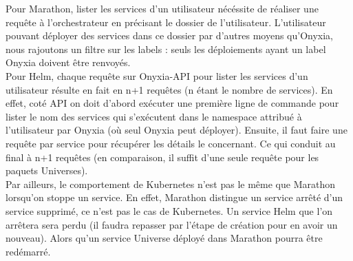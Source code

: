 \documentclass[11pt,fleqn]{book} %
\begin{document}
Pour Marathon, lister les services d'un utilisateur nécéssite de réaliser une requête à l'orchestrateur en précisant le dossier de l'utilisateur. L'utilisateur pouvant déployer des services dans ce dossier par d'autres moyens qu'Onyxia, nous rajoutons un filtre sur les labels : seuls les déploiements ayant un label Onyxia doivent être renvoyés.\\

Pour Helm, chaque requête sur Onyxia-API pour lister les services d'un utilisateur résulte en fait en n+1 requêtes (n étant le nombre de services). En effet, coté API on doit d'abord exécuter une première ligne de commande pour lister le nom des services qui s'exécutent dans le namespace attribué à l'utilisateur par Onyxia (où seul Onyxia peut déployer). Ensuite, il faut faire une requête par service pour récupérer les détails le concernant. Ce qui conduit au final à n+1 requêtes (en comparaison, il suffit d'une seule requête pour les paquets Universes). \\

Par ailleurs, le comportement de Kubernetes n'est pas le même que Marathon lorsqu'on stoppe un service. En effet, Marathon distingue un service arrêté d'un service supprimé, ce n'est pas le cas de Kubernetes. Un service Helm que l'on arrêtera sera perdu (il faudra repasser par l'étape de création pour en avoir un nouveau). Alors qu'un service Universe déployé dans Marathon pourra être redémarré.
\end{document}
